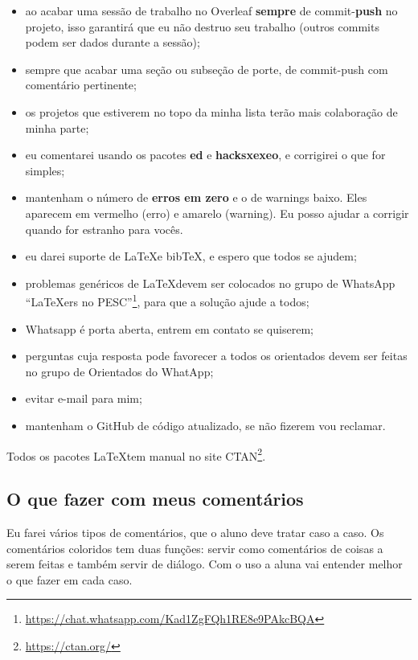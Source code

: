 \documentclass{article}
\begin{document}
\begin{itemize}
    \item ao acabar uma sessão de trabalho no Overleaf \textbf{sempre} de commit-\textbf{push} no projeto, isso garantirá que eu não destruo seu trabalho (outros commits podem ser dados durante a sessão);
    \item sempre que acabar uma seção ou subseção de porte, de commit-push com comentário pertinente;
    \item os projetos que estiverem no topo da minha lista terão mais colaboração de minha parte;
    \item eu comentarei usando os pacotes \textbf{ed} e \textbf{hacksxexeo}, e corrigirei o que for simples;
    \item mantenham o número de \textbf{erros em zero} e o de warnings baixo. Eles aparecem em vermelho (erro) e amarelo (warning). Eu posso ajudar a corrigir quando for estranho para vocês.
    \item eu darei suporte de \LaTeX e bib\TeX, e espero que todos se ajudem;
    \item problemas genéricos de \LaTeX devem ser colocados no grupo de WhatsApp ``\LaTeX ers no PESC''\footnote{\url{https://chat.whatsapp.com/Kad1ZgFQh1RE8e9PAkcBQA}}, para que a solução ajude a todos;
    \item Whatsapp é porta aberta, entrem em contato se quiserem;
    \item perguntas cuja resposta pode favorecer a todos os orientados devem ser feitas no grupo de Orientados do WhatApp;
    \item evitar e-mail para mim;
    \item mantenham o GitHub de código atualizado, se não fizerem vou reclamar.
\end{itemize}

Todos os pacotes \LaTeX tem manual no site CTAN\footnote{\url{https://ctan.org/}}.

\subsection{O que fazer com meus comentários}

Eu farei vários tipos de comentários, que o aluno deve tratar caso a caso. Os comentários coloridos tem duas funções: servir como comentários de coisas a serem feitas e também servir de diálogo. Com o uso a aluna vai entender melhor o que fazer em cada caso.
\end{document}
